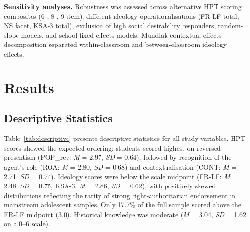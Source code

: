 \documentclass[referee,pdflatex,sn-apa]{sn-jnl}
\begin{document}
\textbf{Sensitivity analyses.} Robustness was assessed across alternative HPT scoring composites (6-, 8-, 9-item), different ideology operationalisations (FR-LF total, NS facet, KSA-3 total), exclusion of high social desirability responders, random-slope models, and school fixed-effects models. Mundlak contextual effects decomposition \citep{Mundlak1978} separated within-classroom and between-classroom ideology effects.

\section{Results}\label{sec:results}

\subsection{Descriptive Statistics}\label{subsec:descriptives}

Table~\ref{tab:descriptive} presents descriptive statistics for all study variables. HPT scores showed the expected ordering: students scored highest on reversed presentism (POP\_rev: \textit{M} = 2.97, \textit{SD} = 0.64), followed by recognition of the agent's role (ROA: \textit{M} = 2.80, \textit{SD} = 0.68) and contextualisation (CONT: \textit{M} = 2.71, \textit{SD} = 0.74). Ideology scores were below the scale midpoint (FR-LF: \textit{M} = 2.48, \textit{SD} = 0.75; KSA-3: \textit{M} = 2.86, \textit{SD} = 0.62), with positively skewed distributions reflecting the rarity of strong right-authoritarian endorsement in mainstream adolescent samples. Only 17.7\% of the full sample scored above the FR-LF midpoint (3.0). Historical knowledge was moderate (\textit{M} = 3.04, \textit{SD} = 1.62 on a 0--6 scale).
\end{document}
